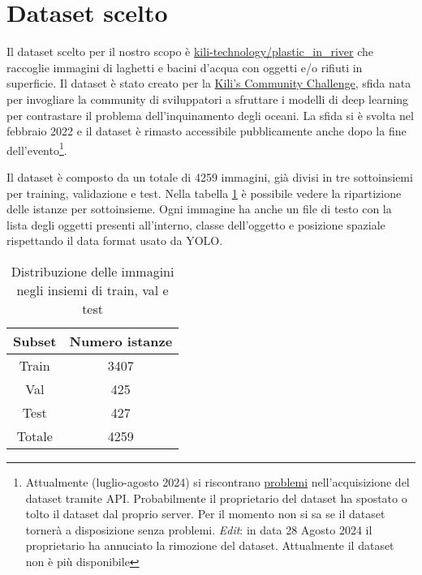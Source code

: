 \section{Dataset scelto}

Il dataset scelto per il nostro scopo è \href{https://huggingface.co/datasets/kili-technology/plastic_in_river}{kili-technology/plastic\_in\_river}
che raccoglie immagini di laghetti e bacini d'acqua con oggetti e/o rifiuti in superficie. 
Il dataset è stato creato per la \href{https://kili-technology.com/data-labeling/machine-learning/kili-s-community-challenge-plastic-in-river-dataset}{Kili's Community Challenge},
sfida nata per invogliare la community di sviluppatori a sfruttare i modelli di deep learning per contrastare il problema dell'inquinamento degli oceani. 
La sfida si è svolta nel febbraio 2022 e il dataset è rimasto accessibile pubblicamente anche dopo la fine 
dell'evento\footnote[1]{Attualmente (luglio-agosto 2024) si riscontrano \href{https://huggingface.co/datasets/kili-technology/plastic_in_river/discussions/2}{problemi} nell'acquisizione del dataset tramite API. Probabilmente il proprietario del dataset 
ha spostato o tolto il dataset dal proprio server. Per il momento non si sa se il dataset tornerà a disposizione senza problemi. \textit{Edit}: in data 28 Agosto 2024 il proprietario ha annuciato la 
rimozione del dataset. Attualmente il dataset non è più disponibile}. 

Il dataset è composto da un totale di 4259 immagini, già divisi in tre sottoinsiemi per training, validazione e test. Nella tabella \ref{table:1} 
è possibile vedere la ripartizione delle istanze per sottoinsieme. Ogni immagine ha anche un file di testo con 
la lista degli oggetti presenti all'interno, classe dell'oggetto e posizione spaziale rispettando il data format usato da YOLO.

\begin{table}[h!]
    \centering
    \begin{tabular}{ |c||c| } 
     \hline
     \textbf{Subset} & \textbf{Numero istanze} \\ 
     \hline
     Train & 3407 \\ 
     Val & 425 \\ 
     Test & 427 \\ 
     \hline
     Totale & 4259 \\
     \hline
    \end{tabular}
    \caption{Distribuzione delle immagini negli insiemi di train, val e test }
\label{table:1}
    \end{table}

